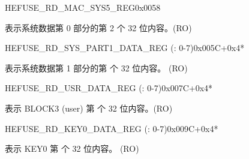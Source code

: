 \begin{register}{H}{EFUSE\_RD\_MAC\_SYS5\_REG}{0x0058}\label{regdesc:EFUSERDMACSYS5REG}
%
\regnewline%
\begin{regdesc}\begin{reglist}
\label{fielddesc:EFUSESYSDATAPART02}\item [EFUSE\_SYS\_DATA\_PART0\_2] 表示系统数据第 0 部分的第 2 个 32 位内容。(RO)
\end{reglist}\end{regdesc}
\end{register}


\begin{register}{H}{EFUSE\_RD\_SYS\_PART1\_DATA\_REG (: 0-7)}{0x005C+0x4*}\label{regdesc:EFUSERDSYSPART1DATANREG}
%
\regnewline%
\begin{regdesc}\begin{reglist}
\label{fielddesc:EFUSESYSDATAPART1N}\item [EFUSE\_SYS\_DATA\_PART1\_\regindex{n}] 表示系统数据第 1 部分的第   个 32 位内容。 (RO)
\end{reglist}\end{regdesc}
\end{register}


\begin{register}{H}{EFUSE\_RD\_USR\_DATA\_REG (: 0-7)}{0x007C+0x4*}\label{regdesc:EFUSERDUSRDATANREG}
%
\regnewline%
\begin{regdesc}\begin{reglist}
\label{fielddesc:EFUSEUSRDATAN}\item [EFUSE\_USR\_DATA\regindex{n}] 表示 BLOCK3 (user) 第  个 32 位内容。(RO)
\end{reglist}\end{regdesc}
\end{register}


\begin{register}{H}{EFUSE\_RD\_KEY0\_DATA\_REG (: 0-7)}{0x009C+0x4*}\label{regdesc:EFUSERDKEY0DATANREG}
%
\regnewline%
\begin{regdesc}\begin{reglist}
\label{fielddesc:EFUSEKEY0DATAN}\item [EFUSE\_KEY0\_DATA\regindex{n}] 表示 KEY0 第  个 32 位内容。 (RO)
\end{reglist}\end{regdesc}
\end{register}


